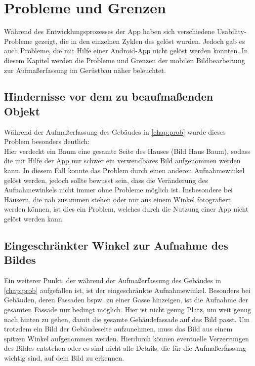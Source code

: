 \section{Probleme und Grenzen}
Während des Entwicklungsprozesses der App haben sich verschiedene Usability-Probleme gezeigt, die in den einzelnen Zyklen des \hcdp{} gelöst wurden.
Jedoch gab es auch Probleme, die mit Hilfe einer Android-App nicht gelöst werden konnten.
In diesem Kapitel werden die Probleme und Grenzen der mobilen Bildbearbeitung zur Aufmaßerfassung im Gerüstbau näher beleuchtet.

\subsection{Hindernisse vor dem zu beaufmaßenden Objekt}
Während der Aufmaßerfassung des Gebäudes in \autoref{chap:prob} wurde dieses Problem besonders deutlich: \\
Hier verdeckt ein Baum eine gesamte Seite des Hauses (Bild Haus Baum), sodass die mit Hilfe der App nur schwer ein verwendbares Bild aufgenommen werden kann.
In diesem Fall konnte das Problem durch einen anderen Aufnahmewinkel gelöst werden, jedoch sollte bewusst sein, dass die Veränderung des Aufnahmewinkels nicht immer ohne Probleme möglich ist.
Insbesondere bei Häusern, die nah zusammen stehen oder nur aus einem Winkel fotografiert werden können, ist dies ein Problem, welches durch die Nutzung einer App nicht gelöst werden kann.

\subsection{Eingeschränkter Winkel zur Aufnahme des Bildes}
Ein weiterer Punkt, der während der Aufmaßerfassung des Gebäudes in \autoref{chap:prob} aufgefallen ist, ist der eingeschränkte Aufnahmewinkel.
Besonders bei Gebäuden, deren Fassaden bspw. zu einer Gasse hinzeigen, ist die Aufnahme der gesamten Fassade nur bedingt möglich.
Hier ist nicht genug Platz, um weit genug nach hinten zu gehen, damit die gesamte Gebäudefassade auf das Bild passt.
Um trotzdem ein Bild der Gebäudeseite aufzunehmen, muss das Bild aus einem spitzen Winkel aufgenommen werden.
Hierdurch können eventuelle Verzerrungen des Bildes entstehen oder es sind nicht alle Details, die für die Aufmaßerfassung wichtig sind, auf dem Bild zu erkennen.
